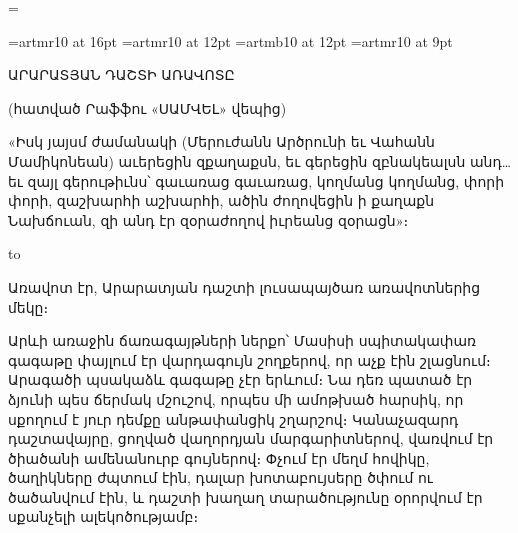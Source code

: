 
\magnification=




\font\artmLARGE=artmr10 at 16pt
\font\artmlarge=artmr10 at 12pt
\font\artmbflarge=artmb10 at 12pt
\font\artmsmall=artmr10 at 9pt
\hyphenchar{}
\artm

\parskip=5pt

\vglue 20pt

\centerline{\artmLARGE ԱՐԱՐԱՏՅԱՆ ԴԱՇՏԻ ԱՌԱՎՈՏԸ}

\smallskip

\centerline{\artmlarge (հատված {\artmbflarge Րաֆֆու} «ՍԱՄՎԵԼ» վեպից)}

\vskip 60pt

{\leftskip=150pt\artmsmall
%
«Իսկ յայսմ ժամանակի (Մերուժանն Արծրունի եւ Վահանն Մամիկոնեան) աւերեցին
զքաղաքսն, եւ գերեցին զբնակեալսն անդ… եւ զայլ գերութիւնս՝ գաւառաց գաւառաց,
կողմանց կող\-մանց, փորի փորի, զաշխարհի աշխարհի, ածին ժողովեցին ի քաղաքն
Նախճուան, զի անդ էր զօրաժողով իւրեանց զօրացն»։
%
\par}

\bigskip

\hbox to 

\vskip 40pt

Առավոտ էր, Արարատյան դաշտի լուսապայծառ առավոտներից մեկը։

Արևի առաջին ճառագայթների ներքո՝ Մասիսի սպիտակափառ գագաթը փայլում էր վարդագույն
շողքերով, որ աչք էին շլացնում։ Արագածի պսակաձև գագաթը չէր երևում։ Նա դեռ պատած
էր ձյունի պես ճերմակ մշուշով, որպես մի ամոթխած հարսիկ, որ սքողում է յուր դեմքը
անթափանցիկ շղարշով։ Կանաչազարդ դաշտավայրը, ցողված վաղորդյան մարգարիտներով,
վառվում էր ծիածանի ամենանուրբ գույներով։ Փչում էր մեղմ հովիկը, ծաղիկները
ժպտում էին, դալար խոտաբույսերը ծփում ու ծածանվում էին, և դաշտի խաղաղ
տարածությունը օրորվում էր սքանչելի ալեկոծությամբ։

